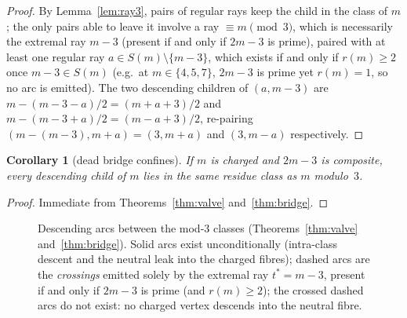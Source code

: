 \documentclass[11pt]{article}
\theoremstyle{plain}
\newtheorem{corollary}[theorem]{Corollary}
\theoremstyle{definition}
\newcommand{\rays}{S}
\newcommand{\rch}{r}
\newcommand{\tstar}{t^{\ast}}
\begin{document}
\begin{proof}
By Lemma~\ref{lem:ray3}, pairs of regular rays keep the child in the
class of $m$; the only pairs able to leave it involve a ray
$\equiv m \pmod 3$, which is necessarily the extremal ray
$m-3$ (present if and only if $2m-3$ is prime), paired with at
least one regular ray $a \in \rays(m) \setminus \{m-3\}$, which
exists if and only if $\rch(m) \ge 2$ once $m-3 \in \rays(m)$
(e.g.\ at $m \in \{4,5,7\}$, $2m-3$ is prime yet $\rch(m) = 1$, so
no arc is emitted). The two descending children of $(a, m-3)$ are
$m - (m-3-a)/2 = (m+a+3)/2$ and $m - (m-3+a)/2 = (m-a+3)/2$,
re-pairing $(m-(m-3), m+a) = (3, m+a)$ and $(3, m-a)$ respectively.
\end{proof}

\begin{corollary}[dead bridge confines]\label{cor:dead}
If $m$ is charged and $2m-3$ is composite, every descending child of
$m$ lies in the same residue class as $m$ modulo~$3$.
\end{corollary}

\begin{proof}
Immediate from Theorems~\ref{thm:valve} and~\ref{thm:bridge}.
\end{proof}

\begin{figure}[htbp]
\centering
{}
\caption{Descending arcs between the mod-3 classes
(Theorems~\ref{thm:valve} and~\ref{thm:bridge}). Solid arcs exist
unconditionally (intra-class descent and the neutral leak into the
charged fibres); dashed arcs are the \emph{crossings} emitted
solely by the extremal ray $\tstar = m-3$, present if and only if
$2m-3$ is prime (and $\rch(m) \ge 2$); the crossed dashed arcs do
not exist: no charged vertex descends into the neutral fibre.}
\label{fig:valve}
\end{figure}
\end{document}
